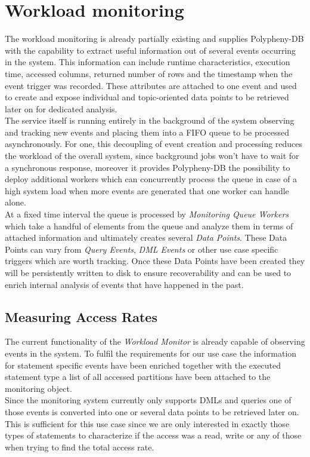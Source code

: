 \section{Workload monitoring}

The workload monitoring is already partially existing and supplies Polypheny-DB with the capability to extract useful information out of several events occurring in the system.
This information can include runtime characteristics, execution time, accessed columns, returned number of rows and the timestamp when the event trigger was recorded.
These attributes are attached to one event and used to create and expose individual and topic-oriented data points to be retrieved later on for dedicated analysis.\\

The service itself is running entirely in the background of the system observing and tracking new events and placing them into a FIFO queue to be processed asynchronously.
For one, this decoupling of event creation and processing reduces the workload of the overall system, since background jobs won't have to wait for a synchronous response, 
moreover it provides Polypheny-DB the possibility to deploy additional workers which can concurrently process the queue in case of a high system load when more events are generated 
that one worker can handle alone. \\
At a fixed time interval the queue is processed by \textit{Monitoring Queue Workers} which take a handful of elements from the queue and analyze them in terms of attached information 
and ultimately creates several \textit{Data Points}.
These Data Points can vary from \textit{Query Events}, \textit{DML Events} or other use case specific triggers which are worth tracking.
Once these Data Points have been created they will be persistently written to disk to ensure recoverability and can be used to enrich internal analysis of events that have 
happened in the past.

\subsection{Measuring Access Rates}
The current functionality of the \textit{Workload Monitor} is already capable of observing events in the system.
To fulfil the requirements for our use case the information for statement specific events have been enriched together with the executed statement type 
a list of all accessed partitions have been attached to the monitoring object.\\
Since the monitoring system currently only supports DMLs and queries one of those events is converted into one or several data points to be retrieved later on. 
This is sufficient for this use case since we are only interested in exactly those types of statements to characterize if the access was a read, write or any of those when trying to 
find the total access rate.\\


